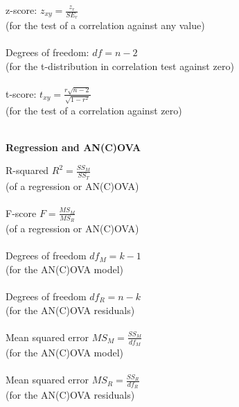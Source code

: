 \begin{minipage}[t]{.45\textwidth}
z-score: \hfill $z_{xy} = \frac{z_r}{SE_r}$\\
{\scriptsize (for the test of a correlation against any value)} \\
\\
Degrees of freedom: \hfill $df = n - 2$\\
{\scriptsize (for the t-distribution in correlation test against zero)} \\
\\
t-score: \hfill $t_{xy} = \frac{r \sqrt{n - 2}}{\sqrt{1 - r^2}}$\\
{\scriptsize (for the test of a correlation against zero)} \\
\\
\begin{center}
    \textbf{Regression and AN(C)OVA}
\end{center}
\hline
\answerskip
R-squared \hfill $R^2 = \frac{SS_M}{SS_T}$ \\
{\scriptsize (of a regression or AN(C)OVA)} \\
\\
F-score \hfill $F = \frac{MS_M}{MS_R}$ \\
{\scriptsize (of a regression or AN(C)OVA)} \\
\\
Degrees of freedom \hfill $df_M = k - 1$ \\
{\scriptsize (for the AN(C)OVA model)} \\
\\
Degrees of freedom \hfill $df_R = n - k$ \\
{\scriptsize (for the AN(C)OVA residuals)} \\
\\
Mean squared error \hfill $MS_M = \frac{SS_M}{df_M}$ \\
{\scriptsize (for the AN(C)OVA model)} \\
\\
Mean squared error \hfill $MS_R = \frac{SS_R}{df_R}$ \\
{\scriptsize (for the AN(C)OVA residuals)} \\
\\
\end{minipage}
\hfill\vline\hfill

